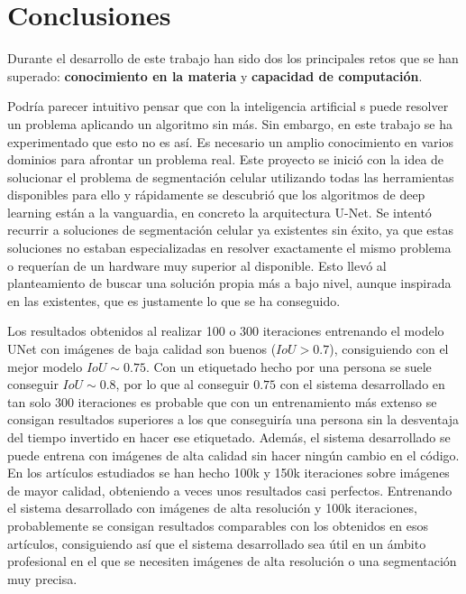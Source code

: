 \chapter{Conclusiones}\label{pruebas}

Durante el desarrollo de este trabajo han sido dos los principales retos que se han superado: \textbf{conocimiento en la materia} y \textbf{capacidad de computación}.

Podría parecer intuitivo pensar que con la inteligencia artificial s puede resolver un problema aplicando un algoritmo sin más. Sin embargo, en este trabajo se ha experimentado que esto no es así. Es necesario un amplio conocimiento en varios dominios para afrontar un problema real. Este proyecto se inició con la idea de solucionar el problema de segmentación celular utilizando todas las herramientas disponibles para ello y rápidamente se descubrió que los algoritmos de deep learning están a la vanguardia, en concreto la arquitectura U-Net. Se intentó recurrir a soluciones de segmentación celular ya existentes sin éxito, ya que estas soluciones no estaban especializadas en resolver exactamente el mismo problema o requerían de un hardware muy superior al disponible. Esto llevó al planteamiento de buscar una solución propia más a bajo nivel, aunque inspirada en las existentes, que es justamente lo que se ha conseguido.

Los resultados obtenidos al realizar 100 o 300 iteraciones entrenando el modelo UNet con imágenes de baja calidad son buenos ($IoU>0.7$), consiguiendo con el mejor modelo $IoU\sim0.75$. Con un etiquetado hecho por una persona se suele conseguir $IoU\sim0.8$, por lo que al conseguir $0.75$ con el sistema desarrollado en tan solo 300 iteraciones es probable que con un entrenamiento más extenso se consigan resultados superiores a los que conseguiría una persona sin la desventaja del tiempo invertido en hacer ese etiquetado. Además, el sistema desarrollado se puede entrena con imágenes de alta calidad sin hacer ningún cambio en el código. En los artículos estudiados se han hecho 100k y 150k iteraciones sobre imágenes de mayor calidad, obteniendo a veces unos resultados casi perfectos. Entrenando el sistema desarrollado con imágenes de alta resolución y 100k iteraciones, probablemente se consigan resultados comparables con los obtenidos en esos artículos, consiguiendo así que el sistema desarrollado sea útil en un ámbito profesional en el que se necesiten imágenes de alta resolución o una segmentación muy precisa.


